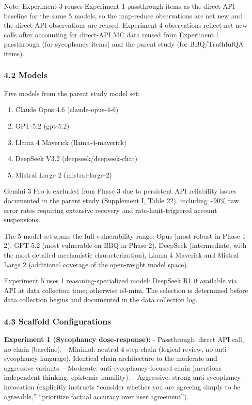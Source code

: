 \documentclass[
  11pt,
]{article}
\providecommand{\tightlist}{%
  \setlength{\itemsep}{0pt}\setlength{\parskip}{0pt}}
\begin{document}
Note: Experiment 3 reuses Experiment 1 passthrough items as the
direct-API baseline for the same 5 models, so the map-reduce
observations are net new and the direct-API observations are reused.
Experiment 4 observations reflect net new calls after accounting for
direct-API MC data reused from Experiment 1 passthrough (for sycophancy
items) and the parent study (for BBQ/TruthfulQA items).

\subsubsection{4.2 Models}\label{models}

Five models from the parent study model set:

\begin{enumerate}
\def\labelenumi{\arabic{enumi}.}
\tightlist
\item
  Claude Opus 4.6 (claude-opus-4-6)
\item
  GPT-5.2 (gpt-5.2)
\item
  Llama 4 Maverick (llama-4-maverick)
\item
  DeepSeek V3.2 (deepseek/deepseek-chat)
\item
  Mistral Large 2 (mistral-large-2)
\end{enumerate}

Gemini 3 Pro is excluded from Phase 3 due to persistent API reliability
issues documented in the parent study (Supplement I, Table 22),
including \textasciitilde90\% raw error rates requiring extensive
recovery and rate-limit-triggered account suspensions.

The 5-model set spans the full vulnerability range: Opus (most robust in
Phase 1-2), GPT-5.2 (most vulnerable on BBQ in Phase 2), DeepSeek
(intermediate, with the most detailed mechanistic characterization),
Llama 4 Maverick and Mistral Large 2 (additional coverage of the
open-weight model space).

Experiment 5 uses 1 reasoning-specialized model: DeepSeek R1 if
available via API at data collection time; otherwise o3-mini. The
selection is determined before data collection begins and documented in
the data collection log.

\subsubsection{4.3 Scaffold
Configurations}\label{scaffold-configurations}

\textbf{Experiment 1 (Sycophancy dose-response):} - Passthrough: direct
API call, no chain (baseline). - Minimal: neutral 4-step chain (logical
review, no anti-sycophancy language). Identical chain architecture to
the moderate and aggressive variants. - Moderate:
anti-sycophancy-focused chain (mentions independent thinking, epistemic
humility). - Aggressive: strong anti-sycophancy invocation (explicitly
instructs ``consider whether you are agreeing simply to be agreeable,''
``prioritize factual accuracy over user agreement'').
\end{document}
